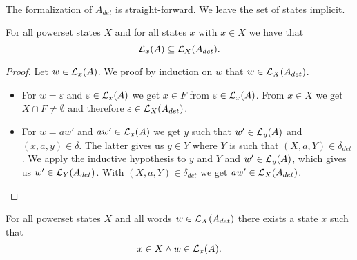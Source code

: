     \paragraph{}
    The formalization of $A_{det}$ is straight-forward. 
    We leave the set of states implicit.


    \begin{lemma}
        \label{nfa_to_dfa_complete}
        For all powerset states $X$ and for all states $x$ with $x \in X$ we have that
        \begin{equation*}
            \mathcal{L}_{x}(A) \subseteq \mathcal{L}_{X}(A_{det}).
        \end{equation*}
    \end{lemma}

    \begin{proof}
        Let $w \in \mathcal{L}_{x}(A)$. We proof by induction on $w$ that $w \in \mathcal{L}_{X}(A_{det})$. 
        \begin{itemize}
            \item
                For $w = \varepsilon$ and $\varepsilon \in \mathcal{L}_{x}(A)$ we get $x \in F$ from $\varepsilon \in \mathcal{L}_{x}(A)$. 
                From $x \in X$ we get $X \cap F \neq \emptyset$ and therefore $\varepsilon \in \mathcal{L}_{X}(A_{det})$.
            \item
                For $w = a w'$ and $a w' \in \mathcal{L}_{x}(A)$ we get $y$ such that $w' \in \mathcal{L}_{y}(A)$ and $(x,a,y) \in \delta$.
                The latter gives us $y \in Y$ where $Y$ is such that $(X, a, Y) \in \delta_{det}$.
                We apply the inductive hypothesis to $y$ and $Y$ and $w' \in \mathcal{L}_{y}(A)$, 
                which gives us $w' \in \mathcal{L}_{Y}(A_{det})$.
                With $(X, a, Y) \in \delta_{det}$ we get $a w' \in \mathcal{L}_{X}(A_{det})$.
        \end{itemize}
    \end{proof}


    \begin{lemma}
        \label{nfa_to_dfa_sound}
        For all powerset states $X$ and all words $w \in \mathcal{L}_{X}(A_{det})$ there exists a state $x$ such that 
        \begin{equation*}
            x \in X \wedge
            w \in \mathcal{L}_{x}(A).
        \end{equation*}
    \end{lemma}


